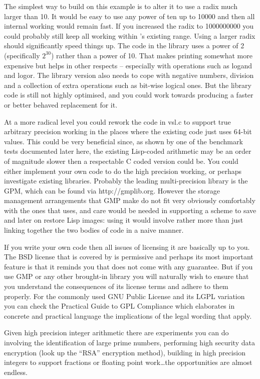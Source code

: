 The simplest way to build on this example is to alter it to use
a radix much larger than 10. It would be easy to use any power of ten up to
10000 and then all internal working would remain fast. If you increased
the radix to 1000000000 you could probably still keep all working within
\vsl's existing range. Using a larger radix should significantly speed
things up. The code in the \vsl{} library uses a power of 2 (specifically
$2^{30}$) rather than a power of 10. That makes printing somewhat more
expensive but helps in other respects -- especially with operations such as
{\tx logand} and {\tx logor}. The library version also needs to cope with
negative numbers, division and a collection of extra operations such as
bit-wise logical ones. But the library code is still not highly optimised,
and you could work towards producing a faster or better behaved
replacement for it.

At a more radical level you could rework the code in {\tx vsl.c} to support
true arbitrary precision working in the places where the existing code
just uses 64-bit values. This could be very beneficial since, as shown
by one of the benchmark tests documented later here, the existing
Lisp-coded arithmetic may be an order of magnitude slower then a
respectable C coded version could be.
You could either implement your own code to do the
high precision working, or perhaps investigate existing libraries.
Probably the leading multi-precision library is the GPM, which can be found
via {\tx http://gmplib.org}. However the storage management arrangements that
GMP make do not fit very obviously comfortably with the ones that \vsl{}
uses, and care would be needed in supporting a scheme to save and later
on restore Lisp images: using it would involve rather more than just
linking together the two bodies of code in a naive manner. 

If you write your own code then all issues of licensing it are basically up
to you. The BSD license that \vsl{} is covered by is permissive and perhaps
its most important feature is that it reminds you that \vsl{} does not
come with any guarantee. But if you use GMP or any other brought-in
library you will naturally wish to ensure that you understand the
consequences of its license terms and adhere to them properly.
For the commonly used GNU Public License and its LGPL variation
you can check the Practical Guide to GPL Compliance\cite{practicalgpl}
which elaborates in concrete and practical language the implications of
the legal wording that apply.

Given high precision integer arithmetic there are experiments you can do
involving the identification of large prime numbers, performing high
security data encryption (look up the ``RSA'' encryption method),
building in high precision integers to support fractions or floating
point work\ldots the opportunities are almost endless.


